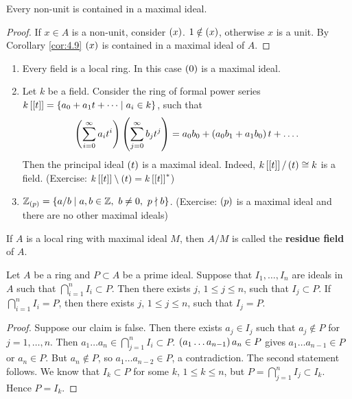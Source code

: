 \begin{corollary}
\label{cor:4.10}
Every non-unit is contained in a maximal ideal.
\end{corollary}

\begin{proof}
If $ x \in A $ is a non-unit, consider $ \left( x \right) $. $ 1 \notin \left( x \right) $, otherwise $ x $ is a unit. By Corollary \ref{cor:4.9} $ \left( x \right) $ is contained in a maximal ideal of $ A $.
\end{proof}

\begin{example*}
\hfill
\begin{enumerate}
\item Every field is a local ring. In this case $ \left( 0 \right) $ is a maximal ideal.
\item Let $ k $ be a field. Consider the ring of formal power series $ k\left[ \left[ t \right] \right] = \left\{ a_0 + a_1t + \dots \mid a_i \in k \right\} $, such that
$$ \left( \sum_{i = 0}^\infty a_it^i \right)\left( \sum_{j = 0}^\infty b_jt^j \right) = a_0b_0 + \left( a_0b_1 + a_1b_0 \right)t + \dots. $$
Then the principal ideal $ \left( t \right) $ is a maximal ideal. Indeed, $ k\left[ \left[ t \right] \right] / \left( t \right) \cong k $ is a field. (Exercise: $ k\left[ \left[ t \right] \right] \setminus \left( t \right) = k\left[ \left[ t \right] \right]^* $)
\item $ \mathbb{Z}_{\left( p \right)} = \left\{ a / b \mid a, b \in \mathbb{Z}, \ b \ne 0, \ p \nmid b \right\} $. (Exercise: $ \left( p \right) $ is a maximal ideal and there are no other maximal ideals)
\end{enumerate}
\end{example*}

If $ A $ is a local ring with maximal ideal $ M $, then $ A / M $ is called the \textbf{residue field} of $ A $.

\begin{lemma}
\label{lem:4.12}
Let $ A $ be a ring and $ P \subset A $ be a prime ideal. Suppose that $ I_1, \dots, I_n $ are ideals in $ A $ such that $ \bigcap_{i = 1}^n I_i \subset P $. Then there exists $ j $, $ 1 \le j \le n $, such that $ I_j \subset P $. If $ \bigcap_{i = 1}^n I_i = P $, then there exists $ j $, $ 1 \le j \le n $, such that $ I_j = P $.
\end{lemma}

\begin{proof}
Suppose our claim is false. Then there exists $ a_j \in I_j $ such that $ a_j \notin P $ for $ j = 1, \dots, n $. Then $ a_1 \dots a_n \in \bigcap_{j = 1}^n I_i \subset P $. $ \left( a_1 \dots a_{n - 1} \right)a_n \in P $ gives $ a_1 \dots a_{n - 1} \in P $ or $ a_n \in P $. But $ a_n \notin P $, so $ a_1 \dots a_{n - 2} \in P $, a contradiction. The second statement follows. We know that $ I_k \subset P $ for some $ k $, $ 1 \le k \le n $, but $ P = \bigcap_{j = 1}^n I_j \subset I_k $. Hence $ P = I_k $.
\end{proof}

